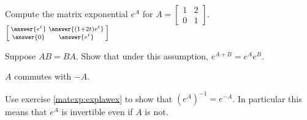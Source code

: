 \documentclass{ximera}
\begin{document}
\begin{exercise}
    Compute the matrix exponential $e^A$ for $A = 
    \left[ 
        \begin{smallmatrix} 
            1 & 2 \\ 
            0 & 1 
        \end{smallmatrix} 
    \right]$.\\
    $\left[\begin{smallmatrix} \answer{e^t} & \answer{(1+2t)e^t} \\ \answer{0} & \answer{e^t} \end{smallmatrix}\right]$
\end{exercise}

\begin{exercise}%
    Suppose $AB = BA$.  Show that under this assumption, $e^{A+B} = e^A e^B$.
\end{exercise}

\begin{exercise} \label{matexp:expinvex}
    \begin{hint}
        $A$ commutes with $-A$.
    \end{hint}
    Use exercise \ref{matexp:explawex} to show that ${(e^{A})}^{-1} = e^{-A}$.  In particular this means that $e^A$ is invertible even if $A$ is not.
\end{exercise}
\end{document}
